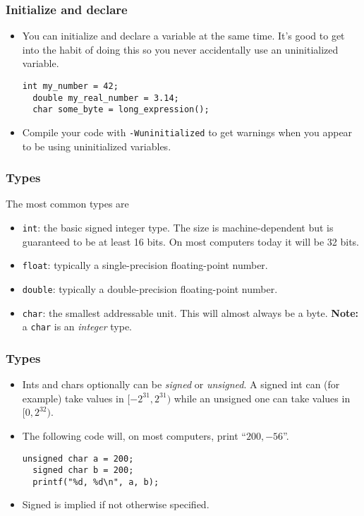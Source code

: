 \begin{frame}[fragile]
  \frametitle{Initialize and declare}
  \begin{itemize}
  \item You can initialize and declare a variable at the same time. It's good to
    get into the habit of doing this so you never accidentally use an
    uninitialized variable.
    \begin{lstlisting}[style=c]
  int my_number = 42;
  double my_real_number = 3.14;
  char some_byte = long_expression();
    \end{lstlisting}
  \item Compile your code with \texttt{-Wuninitialized} to get warnings when you
    appear to be using uninitialized variables.
  \end{itemize}
\end{frame}

\begin{frame}
  \frametitle{Types}
  The most common types are
  \begin{itemize}
  \item \texttt{int}: the basic signed integer type. The size is
    machine-dependent but is guaranteed to be at least 16 bits. On most
    computers today it will be 32 bits.
  \item \texttt{float}: typically a single-precision floating-point number.
  \item \texttt{double}: typically a double-precision floating-point number.
  \item \texttt{char}: the smallest addressable unit. This will almost always be
    a byte. \textbf{Note:} a \texttt{char} is an \emph{integer} type.
  \end{itemize}
\end{frame}

\begin{frame}[fragile]
  \frametitle{Types}
  \begin{itemize}
  \item Ints and chars optionally can be \emph{signed} or \emph{unsigned}. A
    signed int can (for example) take values in $[-2^{31}, 2^{31})$ while an
    unsigned one can take values in $[0,2^{32})$.
  \item The following code will, on most computers, print ``$200, -56$''.
    \begin{lstlisting}[style=c]
  unsigned char a = 200;
  signed char b = 200;
  printf("%d, %d\n", a, b);
    \end{lstlisting}
  \item Signed is implied if not otherwise specified.
  \end{itemize}
\end{frame}

